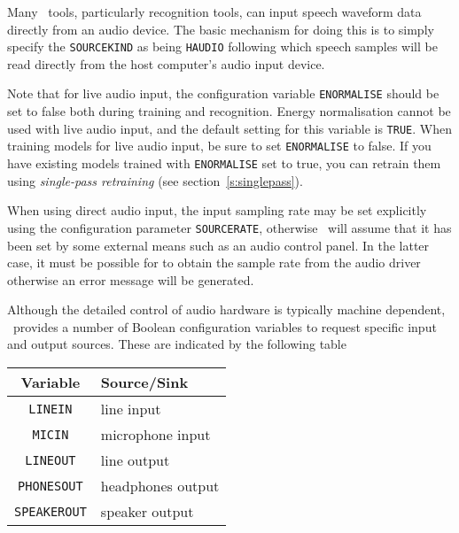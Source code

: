 
Many \HTK\ tools, particularly recognition tools, can input speech waveform
data directly from an audio device.  The basic mechanism for doing this is to
simply specify the \texttt{SOURCEKIND} as being
\texttt{HAUDIO} following which speech samples
will be read directly from the host computer's audio input device.

Note that for live audio input, the configuration variable 
\texttt{ENORMALISE} should be set to false both during training and recognition. Energy normalisation cannot
be used with live audio input, and the default setting for this variable
is \texttt{TRUE}. When training models for live audio input, be sure to
set \texttt{ENORMALISE} to false. If you have existing models trained with 
\texttt{ENORMALISE} set to true, you can retrain them using {\it single-pass
retraining} (see section~\ref{s:singlepass}).

When using direct audio input, the input sampling
rate may be set explicitly using the configuration parameter
\texttt{SOURCERATE},  otherwise 
\HTK\ will assume that it has been set by some external means such as an
audio control panel.  In the latter case, it must be possible for
 to obtain the sample rate from the audio driver
otherwise an error message will be generated.

Although the detailed control of audio hardware is typically machine dependent,
\HTK\ provides a number of Boolean configuration variables to request specific
input and output sources.  These are indicated by the following table
\begin{center}
\begin{tabular}{|c|l|} \hline
Variable   & Source/Sink \\ \hline
\texttt{LINEIN}   & line input \\ 
\texttt{MICIN}   & microphone input \\ 
\texttt{LINEOUT}   & line output \\
\texttt{PHONESOUT}   & headphones output \\ 
\texttt{SPEAKEROUT} & speaker output \\ \hline
\end{tabular}
\end{center}

